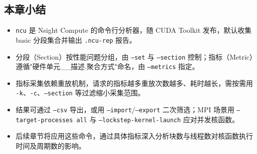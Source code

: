 \subsection{本章小结}

\begin{itemize}
    \item \texttt{ncu} 是 Nsight Compute 的命令行分析器，随 CUDA Toolkit 发布，默认收集 basic 分段集合并输出 \texttt{.ncu-rep} 报告。
    \item 分段（Section）按性能问题分组，由 \texttt{--set} 与 \texttt{--section} 控制；指标（Metric）遵循"硬件单元\_\_描述.聚合方式"命名，由 \texttt{--metrics} 指定。
    \item 指标采集依赖重放机制，请求的指标越多重放次数越多、耗时越长，需按需用 \texttt{-k}、\texttt{-c}、\texttt{--section} 等过滤缩小采集范围。
    \item 结果可通过 \texttt{--csv} 导出，或用 \texttt{--import}/\texttt{--export} 二次筛选；MPI 场景用 \texttt{--target-processes all} 与 \texttt{--lockstep-kernel-launch} 应对并发核函数。
    \item 后续章节将应用这些命令，通过具体指标深入分析块数与线程数对核函数执行时间及周期数的影响。
\end{itemize}
